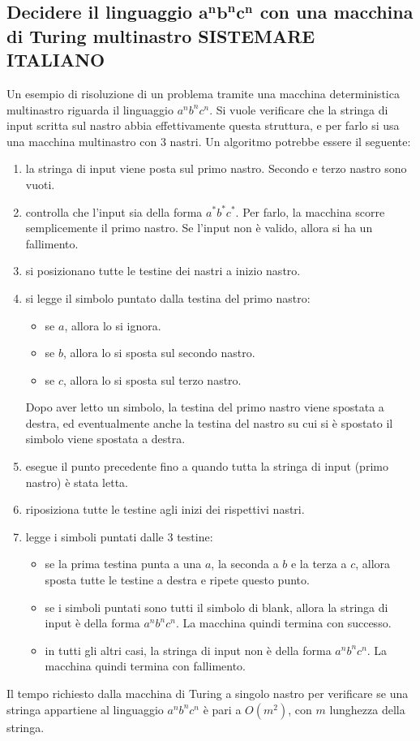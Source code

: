 \subsection*{Decidere il linguaggio $\mathbf{a^nb^nc^n}$ con una macchina di
Turing multinastro SISTEMARE ITALIANO}
Un esempio di risoluzione di un problema tramite una macchina deterministica
multinastro riguarda il linguaggio $a^nb^nc^n$.
Si vuole verificare che la stringa di input scritta sul nastro abbia
effettivamente questa struttura, e per farlo si usa una macchina multinastro
con 3 nastri.
Un algoritmo potrebbe essere il seguente:
\begin{enumerate}
    \item la stringa di input viene posta sul primo nastro. Secondo e terzo
    nastro sono vuoti.
    \item controlla che l'input sia della forma $a^*b^*c^*$. Per farlo,
    la macchina scorre semplicemente il primo nastro.
    Se l'input non è valido, allora si ha un fallimento.
    \item si posizionano tutte le testine dei nastri a inizio nastro.
    \item si legge il simbolo puntato dalla testina del primo nastro:
    \begin{itemize}
        \item se $a$, allora lo si ignora.
        \item se $b$, allora lo si sposta sul secondo nastro.
        \item se $c$, allora lo si sposta sul terzo nastro.
    \end{itemize}
    Dopo aver letto un simbolo, la testina del primo nastro viene spostata a
    destra, ed eventualmente anche la testina del nastro su cui si è spostato
    il simbolo viene spostata a destra.
    \item esegue il punto precedente fino a quando tutta la stringa di input
    (primo nastro) è stata letta.
    \item riposiziona tutte le testine agli inizi dei rispettivi nastri.
    \item legge i simboli puntati dalle 3 testine:
    \begin{itemize}
        \item se la prima testina punta a una $a$, la seconda a $b$ e la terza
        a $c$, allora sposta tutte le testine a destra e ripete questo punto.
        \item se i simboli puntati sono tutti il simbolo di blank, allora la
        stringa di input è della forma $a^nb^nc^n$. La macchina quindi termina
        con successo.
        \item in tutti gli altri casi, la stringa di input non è della forma
        $a^nb^nc^n$. La macchina quindi termina con fallimento.
    \end{itemize}
\end{enumerate}

\begin{rem}
    Il tempo richiesto dalla macchina di Turing a singolo nastro per
    verificare se una stringa appartiene al linguaggio $a^nb^nc^n$ è pari a
    $O(m^2)$, con $m$ lunghezza della stringa.
\end{rem}

